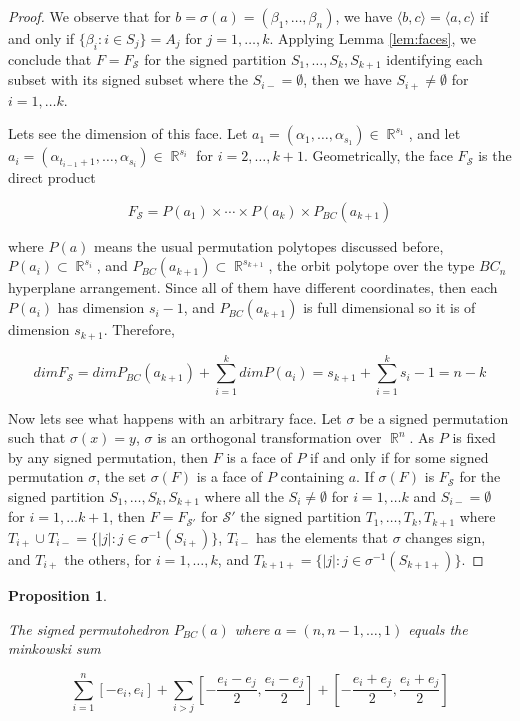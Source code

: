 \documentclass[12pt]{amsart}
\newtheorem{propo}[lemma]{Proposition}
\numberwithin{equation}{section}
\newcommand{\RR}{\operatorname{\mathbb{R}}}
\begin{document}
\begin{proof}
We observe that for $b=\sigma(a)=(\beta_1,\dots,\beta_n)$, we have $\langle b, c \rangle=\langle a, c \rangle$ if and only if $\{ \beta_i : i\in S_j \}=A_j$ for $j=1,\dots, k$. Applying Lemma \ref{lem:faces}, we conclude that $F=F_{\mathcal{S}}$ for the signed partition $S_1, \dots, S_k, S_{k+1}$ identifying each subset with its signed subset where the $S_{i-}=\emptyset$, then we have $S_{i+}\not=\emptyset$ for $i=1,\dots k$.

Lets see the dimension of this face. Let $a_1=(\alpha_1,\dots,\alpha_{s_1})\in \RR^{s_1}$, and let $a_i=(\alpha_{t_{i-1}+1},\dots,\alpha_{s_i})\in \RR^{s_i}$ for $i=2,\dots, k+1$. Geometrically, the face $F_{\mathcal{S}}$ is the direct product 

$$ F_{\mathcal{S}}=P(a_1)\times \cdots \times P(a_k) \times P_{BC}(a_{k+1}) $$

where $P(a)$ means the usual permutation polytopes discussed before, $P(a_i)\subset \RR^{s_i}$, and $P_{BC}(a_{k+1})\subset \RR^{s_{k+1}}$, the orbit polytope over the type $BC_n$ hyperplane arrangement. Since all of them have different coordinates, then each $P(a_i)$ has dimension $s_i-1$, and $P_{BC}(a_{k+1})$ is full dimensional so it is of dimension $s_{k+1}$. Therefore,

$$ dim F_{\mathcal{S}}=dim P_{BC}(a_{k+1}) + \sum_{i=1}^k dim P(a_i)=s_{k+1} +\sum_{i=1}^k s_i-1=n-k$$

Now lets see what happens with an arbitrary face. Let $\sigma$ be a signed permutation such that $\sigma(x)=y$, $\sigma $ is an orthogonal transformation over $\RR^n$. As $P$ is fixed by any signed permutation, then $F$ is a face of $P$ if and only if for some signed permutation $\sigma$, the set $\sigma(F)$ is a face of $P$ containing $a$. If $\sigma(F)$ is $F_{\mathcal{S}}$ for the signed partition $S_1, \dots, S_k,S_{k+1}$ where all the $S_i\neq\emptyset$ for $i=1,\dots k$ and $S_{i-}=\emptyset$ for $i=1,\dots k+1$, then $F=F_{\mathcal{S'}}$ for $\mathcal{S'}$ the signed partition $T_1, \dots, T_k, T_{k+1}$ where $T_{i+}\cup T_{i-}=\{ |j|: j\in \sigma^{-1}(S_{i+}) \}$, $T_{i-}$ has the elements that $\sigma $ changes sign, and $T_{i+}$ the others, for $i=1,\dots, k$, and $T_{k+1+}=\{ |j|: j\in\sigma^{-1}(S_{k+1+}) \}$.





\end{proof}



\begin{propo}
\label{prop:spermzono}


The signed permutohedron $P_{BC}(a)$ where $a=(n,n-1,\dots,1)$ equals the minkowski sum

$$ \sum_{i=1}^n [ -e_i,e_i ] + \sum_{i>j}[-\frac{e_i-e_j}{2},\frac{e_i-e_j}{2}]+[-\frac{e_i+e_j}{2},\frac{e_i+e_j}{2}] $$
\end{propo}
\end{document}
